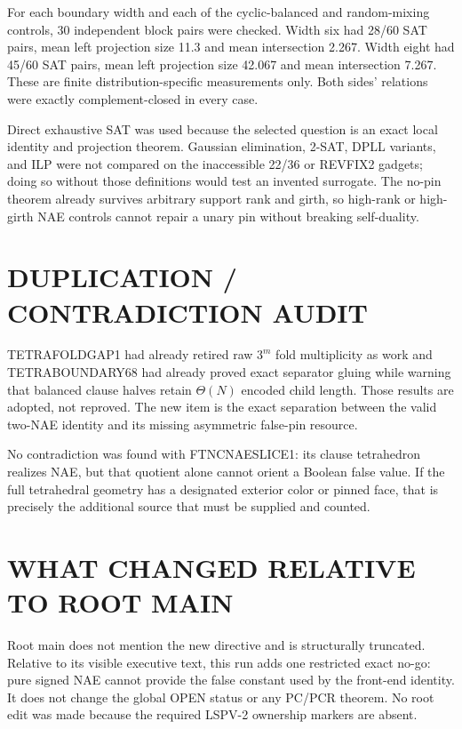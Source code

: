 \documentclass[11pt]{article}
\begin{document}
For each boundary width and each of the cyclic-balanced and random-mixing
controls, 30 independent block pairs were checked.  Width six had 28/60 SAT
pairs, mean left projection size 11.3 and mean intersection 2.267.  Width eight
had 45/60 SAT pairs, mean left projection size 42.067 and mean intersection
7.267.  These are finite distribution-specific measurements only.  Both sides'
relations were exactly complement-closed in every case.

Direct exhaustive SAT was used because the selected question is an exact local
identity and projection theorem.  Gaussian elimination, 2-SAT, DPLL variants,
and ILP were not compared on the inaccessible 22/36 or REVFIX2 gadgets; doing
so without those definitions would test an invented surrogate.  The no-pin
theorem already survives arbitrary support rank and girth, so high-rank or
high-girth NAE controls cannot repair a unary pin without breaking self-duality.

\section{DUPLICATION / CONTRADICTION AUDIT}
TETRAFOLDGAP1 had already retired raw $3^m$ fold multiplicity as work and
TETRABOUNDARY68 had already proved exact separator gluing while warning that
balanced clause halves retain $\Theta(N)$ encoded child length.  Those results
are adopted, not reproved.  The new item is the exact separation between the
valid two-NAE identity and its missing asymmetric false-pin resource.

No contradiction was found with FTNCNAESLICE1: its clause tetrahedron realizes
NAE, but that quotient alone cannot orient a Boolean false value.  If the full
tetrahedral geometry has a designated exterior color or pinned face, that is
precisely the additional source that must be supplied and counted.

\section{WHAT CHANGED RELATIVE TO ROOT MAIN}
Root main does not mention the new directive and is structurally truncated.
Relative to its visible executive text, this run adds one restricted exact
no-go: pure signed NAE cannot provide the false constant used by the front-end
identity.  It does not change the global OPEN status or any PC/PCR theorem.
No root edit was made because the required LSPV-2 ownership markers are absent.
\end{document}
